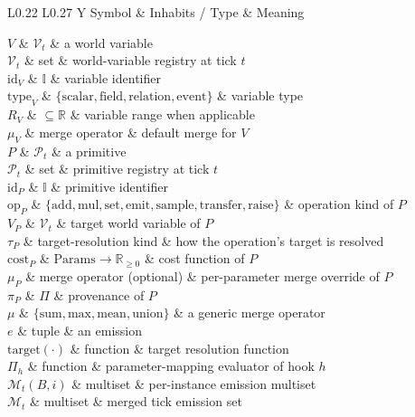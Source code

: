 \documentclass[journal,onecolumn,11pt]{IEEEtran}
\theoremstyle{definition}
\newcommand{\notationtable}[3]{%
  \begin{table}[ht]
  \centering
  \caption{#1}
  \label{#2}
  \small
  \renewcommand{\arraystretch}{1.1}
  \begin{tabularx}{\linewidth}{L{0.22\linewidth} L{0.27\linewidth} Y}
  \toprule
  Symbol & Inhabits / Type & Meaning \\
  \midrule
  #3
  \bottomrule
  \end{tabularx}
  \end{table}%
}
\begin{document}
\notationtable{Symbols introduced in \cref{sec:emit}.}{tab:notation-emit}{
$V$                       & $\mathcal{V}_t$              & a world variable \\
$\mathcal{V}_t$           & set                          & world-variable registry at tick $t$ \\
$\mathrm{id}_V$           & $\mathbb{I}$                 & variable identifier \\
$\mathrm{type}_V$         & $\{\mathrm{scalar},\mathrm{field},\mathrm{relation},\mathrm{event}\}$ & variable type \\
$R_V$                     & $\subseteq \mathbb{R}$       & variable range when applicable \\
$\mu_V$                   & merge operator               & default merge for $V$ \\
$P$                       & $\mathcal{P}_t$              & a primitive \\
$\mathcal{P}_t$           & set                          & primitive registry at tick $t$ \\
$\mathrm{id}_P$           & $\mathbb{I}$                 & primitive identifier \\
$\mathrm{op}_P$           & $\{\mathrm{add},\mathrm{mul},\mathrm{set},\mathrm{emit},\mathrm{sample},\mathrm{transfer},\mathrm{raise}\}$ & operation kind of $P$ \\
$V_P$                     & $\mathcal{V}_t$              & target world variable of $P$ \\
$\tau_P$                  & target-resolution kind       & how the operation's target is resolved \\
$\mathrm{cost}_P$         & $\mathrm{Params} \to \mathbb{R}_{\ge 0}$ & cost function of $P$ \\
$\mu_P$                   & merge operator (optional)    & per-parameter merge override of $P$ \\
$\pi_P$                   & $\Pi$                        & provenance of $P$ \\
$\mu$                     & $\{\mathrm{sum},\mathrm{max},\mathrm{mean},\mathrm{union}\}$ & a generic merge operator \\
$e$                       & tuple                        & an emission \\
$\mathrm{target}(\cdot)$  & function                     & target resolution function \\
$\Pi_h$                   & function                     & parameter-mapping evaluator of hook $h$ \\
$\mathcal{M}_t(B,i)$      & multiset                     & per-instance emission multiset \\
$\mathcal{M}_t$           & multiset                     & merged tick emission set \\
}
\end{document}
